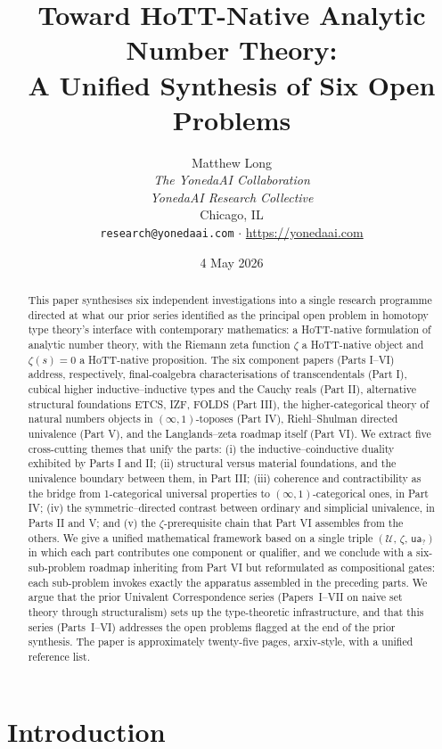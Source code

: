 \documentclass[12pt]{article}
\title{Toward HoTT-Native Analytic Number Theory:\\
A Unified Synthesis of Six Open Problems}
\author{Matthew Long \\
\textit{The YonedaAI Collaboration} \\
\textit{YonedaAI Research Collective} \\
Chicago, IL \\
\texttt{research@yonedaai.com} $\cdot$ \url{https://yonedaai.com}}
\date{4 May 2026}
\theoremstyle{definition}
\theoremstyle{remark}
\newcommand{\Type}{\mathcal{U}}
\newcommand{\ua}{\mathsf{ua}}
\begin{document}
\maketitle

\begin{abstract}
This paper synthesises six independent investigations into a single research
programme directed at what our prior series identified as the principal open
problem in homotopy type theory's interface with contemporary mathematics: a
HoTT-native formulation of analytic number theory, with the Riemann zeta
function $\zeta$ a HoTT-native object and $\zeta(s) = 0$ a HoTT-native
proposition. The six component papers (Parts I--VI) address, respectively,
final-coalgebra characterisations of transcendentals (Part I), cubical
higher inductive--inductive types and the Cauchy reals (Part II),
alternative structural foundations ETCS, IZF, FOLDS (Part III), the
higher-categorical theory of natural numbers objects in $(\infty,1)$-toposes
(Part IV), Riehl--Shulman directed univalence (Part V), and the
Langlands--zeta roadmap itself (Part VI). We extract five cross-cutting
themes that unify the parts: (i) the inductive--coinductive duality
exhibited by Parts I and II; (ii) structural versus material foundations,
and the univalence boundary between them, in Part III; (iii) coherence and
contractibility as the bridge from 1-categorical universal properties to
$(\infty,1)$-categorical ones, in Part IV; (iv) the symmetric--directed
contrast between ordinary and simplicial univalence, in Parts II and V; and
(v) the $\zeta$-prerequisite chain that Part VI assembles from the others.
We give a unified mathematical framework based on a single triple
$(\Type,\,\zeta,\,\ua_{?})$ in which each part contributes one component or
qualifier, and we conclude with a six-sub-problem roadmap inheriting from
Part VI but reformulated as compositional gates: each sub-problem invokes
exactly the apparatus assembled in the preceding parts. We argue that the
prior Univalent Correspondence series (Papers~I--VII on naive set theory
through structuralism) sets up the type-theoretic infrastructure, and that
this series (Parts~I--VI) addresses the open problems flagged at the end of
the prior synthesis. The paper is approximately twenty-five pages,
arxiv-style, with a unified reference list.
\end{abstract}

\tableofcontents

\section{Introduction}\label{sec:intro}
\end{document}
